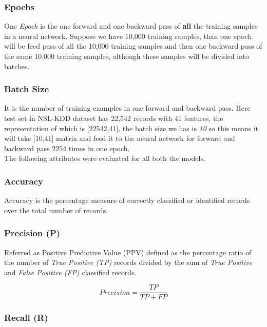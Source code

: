 \documentclass[12pt, a4paper]{report}
\begin{document}
\subsubsection{Epochs}
One \textit{Epoch} is the one forward and one backward pass of \textbf{all} the training samples in a neural network. Suppose we have 10,000 training samples, than one epoch will be feed pass of all the 10,000 training samples and then one backward pass of the same 10,000 training samples, although these samples will be divided into batches.\\

\subsubsection{Batch Size}
It is the number of training examples in one forward and backward pass. Here test set in NSL-KDD dataset has 22,542 records with 41 features, the representation of which is [22542,41], the batch size we has is \textit{10} so this means it will take [10,41] matrix and feed it to the neural network for forward and backward pass 2254 times in one epoch.\\

The following attributes were evaluated for all both the models.\\

\subsubsection{Accuracy}
Accuracy is the percentage measure of correctly classified or identified records over the total number of records.\\

\subsubsection{Precision (P)}
Referred as Positive Predictive Value (PPV)  defined as the percentage ratio of the number of \textit{True Positive (TP)} records divided by the sum of \textit{True Positive} and \textit{False Positive (FP)} classified records.\\ \par
\begin{equation}
Precision = \frac{TP}{TP+FP}
\end{equation}

\subsubsection{Recall (R)}
\end{document}
